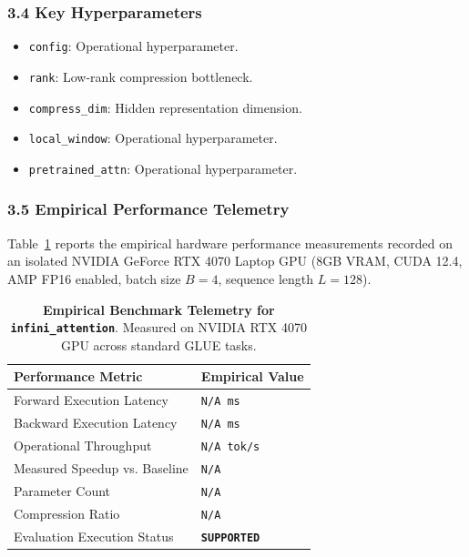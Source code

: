 \subsubsection*{3.4 Key Hyperparameters}
\begin{itemize}
    \item \texttt{config}: Operational hyperparameter.
    \item \texttt{rank}: Low-rank compression bottleneck.
    \item \texttt{compress\_dim}: Hidden representation dimension.
    \item \texttt{local\_window}: Operational hyperparameter.
    \item \texttt{pretrained\_attn}: Operational hyperparameter.
\end{itemize}

\subsubsection*{3.5 Empirical Performance Telemetry}
Table~\ref{tab:telemetry_infini\_attention} reports the empirical hardware performance measurements recorded on an isolated NVIDIA GeForce RTX 4070 Laptop GPU (8GB VRAM, CUDA 12.4, AMP FP16 enabled, batch size $B=4$, sequence length $L=128$).

\begin{table}[h]
\centering
\small
\caption{\textbf{Empirical Benchmark Telemetry for \texttt{infini\_attention}}. Measured on NVIDIA RTX 4070 GPU across standard GLUE tasks.}
\label{tab:telemetry_infini\_attention}
\begin{tabularx}{\columnwidth}{lX}
\toprule
\textbf{Performance Metric} & \textbf{Empirical Value} \\
\midrule
Forward Execution Latency & \texttt{N/A ms} \\
Backward Execution Latency & \texttt{N/A ms} \\
Operational Throughput & \texttt{N/A tok/s} \\
Measured Speedup vs. Baseline & \texttt{N/A} \\
Parameter Count & \texttt{N/A} \\
Compression Ratio & \texttt{N/A} \\
Evaluation Execution Status & \textbf{\texttt{SUPPORTED}} \\
\bottomrule
\end{tabularx}
\end{table}

